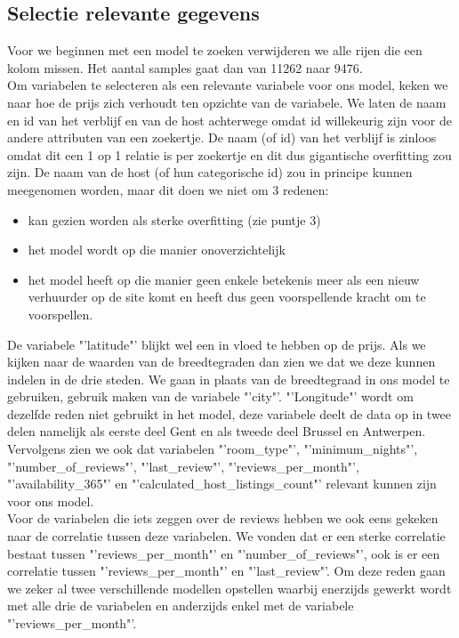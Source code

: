 \documentclass[a4paper,kulak]{kulakarticle} %
\begin{document}
\subsection{Selectie relevante gegevens}
\label{sec:huurprijsSelectie}
Voor we beginnen met een model te zoeken verwijderen we alle rijen die een kolom missen. Het aantal samples gaat dan van 11262 naar 9476.\\

Om variabelen te selecteren als een relevante variabele voor ons model, keken we naar hoe de prijs zich verhoudt ten opzichte van de variabele. We laten de naam en id van het verblijf en van de host achterwege omdat id willekeurig zijn voor de andere attributen van een zoekertje.
De naam (of id) van het verblijf is zinloos omdat dit een 1 op 1 relatie is per zoekertje en dit dus gigantische overfitting zou zijn.
De naam van de host (of hun categorische id) zou in principe kunnen meegenomen worden, maar dit doen we niet om 3 redenen:
\begin{itemize}
	\item kan gezien worden als sterke overfitting (zie puntje 3)
	\item het model wordt op die manier onoverzichtelijk 
	\item het model heeft op die manier geen enkele betekenis meer als een nieuw verhuurder op de site komt en heeft dus geen voorspellende kracht om te voorspellen. 
\end{itemize} 

De variabele "'latitude"' blijkt wel een in vloed te hebben op de prijs. Als we kijken naar de waarden van de breedtegraden dan zien we dat we deze kunnen indelen in de drie steden. We gaan in plaats van de breedtegraad in ons model te gebruiken, gebruik maken van de variabele "'city"'. "'Longitude"' wordt om dezelfde reden niet gebruikt in het model, deze variabele deelt de data op in twee delen namelijk als eerste deel Gent en als tweede deel Brussel en Antwerpen. Vervolgens zien we ook dat variabelen "'room\_type"', "'minimum\_nights"', "'number\_of\_reviews"', "'last\_review"', "'reviews\_per\_month"', "'availability\_365"' en "'calculated\_host\_listings\_count"' relevant kunnen zijn voor ons model. \\

Voor de variabelen die iets zeggen over de reviews hebben we ook eens gekeken naar de correlatie tussen deze variabelen. We vonden dat er een sterke correlatie bestaat tussen "'reviews\_per\_month"' en "'number\_of\_reviews"', ook is er een correlatie tussen "'reviews\_per\_month"' en "'last\_review"'. Om deze reden gaan we zeker al twee verschillende modellen opstellen waarbij enerzijds gewerkt wordt met alle drie de variabelen en anderzijds enkel met de variabele "'reviews\_per\_month"'.\\
\end{document}

